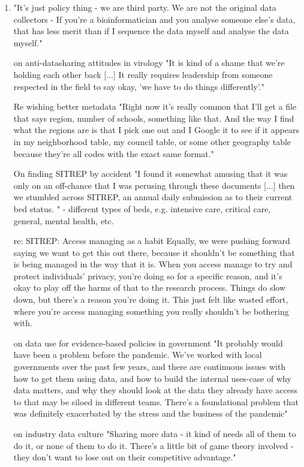 \begin{enumerate}
\item "It's just policy thing - we are third party. We are not the original data collectors - If you're a bioinformatician and you analyse someone else's data, that has less merit than if I sequence the data myself and analyse the data myself."
\item [on anti-datasharing attitudes in virology] "It is kind of a shame that we're holding each other back [...] It really requires leadership from someone respected in the field to say okay, 'we have to do things differently'."
\item [Re wishing better metadata] "Right now it's really common that I'll get a file that says region, number of schools, something like that. And the way I find what the regions are is that I pick one out and I Google it to see if it appears in my neighborhood table, my council table, or some other geography table because they're all codes with the exact same format."
\item [On finding SITREP by accident] "I found it somewhat amusing that it was only on an off-chance that I was perusing through these documents [...] then we stumbled across SITREP, an annual daily submission as to their current bed status. " - different types of  beds, e.g. intensive care, critical care, general, mental health, etc.
\item  [re: SITREP: Access managing as a habit] Equally, we were pushing forward saying we want to get this out there, because it shouldn't be something that is being managed in the way that it is. When you access manage to try and protect individuals' privacy, you're doing so for a specific reason, and it's okay to play off the harms of that to the research process. Things do slow down, but there's a reason you're doing it. This just felt like wasted effort, where you're access managing something you really shouldn't be bothering with.
\item [on data use for evidence-based policies in government] "It probably would have been a problem before the pandemic. We've worked with local governments over the past few years, and there are continuous issues with how to get them using data, and how to build the internal uses-case of why data matters, and why they should look at the data they already have access to that may be siloed in different teams. There's a foundational problem that was definitely exacerbated by the stress and the business of the pandemic"
\item [on industry data culture] "Sharing more data - it kind of needs all of them to do it, or none of them to do it. There's a little bit of game theory involved - they don't want to lose out on their competitive advantage."

\end{enumerate}
